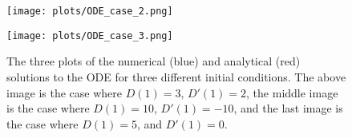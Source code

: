 \begin{figure}[h]
\vspace{-1em}
\centering
\texttt{[image: plots/ODE\_case\_2.png]}
\end{figure}
\begin{figure}[h]
\vspace{-1em}
\centering
\texttt{[image: plots/ODE\_case\_3.png]}
\caption{The three plots of the numerical (blue) and analytical (red) solutions to the ODE for three different initial conditions. The above image is the case where $D(1) = 3$, $D'(1) = 2$, the middle image is the case where $D(1) = 10$, $D'(1) = -10$, and the last image is the case where $D(1) = 5$, and $D'(1) = 0$.}
\end{figure}

\clearpage